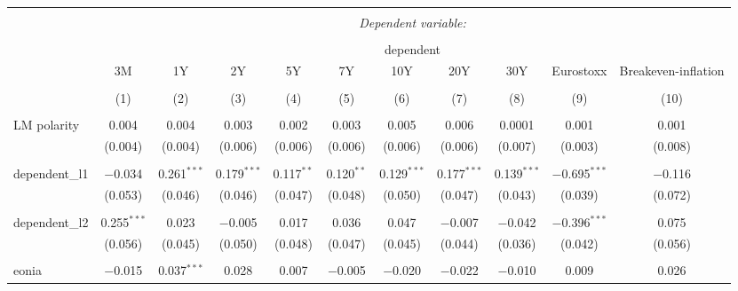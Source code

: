 

\begin{table}[!htbp] \centering 
  \caption{} 
  \label{} 
  \begin{adjustbox}{width=1.35\textwidth}
\begin{tabular}{@{\extracolsep{5pt}}lcccccccccc} 
\\[-1.8ex]\hline 
\hline \\[-1.8ex] 
 & \multicolumn{10}{c}{\textit{Dependent variable:}} \\ 
\cline{2-11} 
\\[-1.8ex] & \multicolumn{10}{c}{dependent} \\ 
 & 3M & 1Y & 2Y & 5Y & 7Y & 10Y & 20Y & 30Y & Eurostoxx & Breakeven-inflation \\ 
\\[-1.8ex] & (1) & (2) & (3) & (4) & (5) & (6) & (7) & (8) & (9) & (10)\\ 
\hline \\[-1.8ex] 
 LM polarity & 0.004 & 0.004 & 0.003 & 0.002 & 0.003 & 0.005 & 0.006 & 0.0001 & 0.001 & 0.001 \\ 
  & (0.004) & (0.004) & (0.006) & (0.006) & (0.006) & (0.006) & (0.006) & (0.007) & (0.003) & (0.008) \\ 
  & & & & & & & & & & \\ 
 dependent\_l1 & $-$0.034 & 0.261$^{***}$ & 0.179$^{***}$ & 0.117$^{**}$ & 0.120$^{**}$ & 0.129$^{***}$ & 0.177$^{***}$ & 0.139$^{***}$ & $-$0.695$^{***}$ & $-$0.116 \\ 
  & (0.053) & (0.046) & (0.046) & (0.047) & (0.048) & (0.050) & (0.047) & (0.043) & (0.039) & (0.072) \\ 
  & & & & & & & & & & \\ 
 dependent\_l2 & 0.255$^{***}$ & 0.023 & $-$0.005 & 0.017 & 0.036 & 0.047 & $-$0.007 & $-$0.042 & $-$0.396$^{***}$ & 0.075 \\ 
  & (0.056) & (0.045) & (0.050) & (0.048) & (0.047) & (0.045) & (0.044) & (0.036) & (0.042) & (0.056) \\ 
  & & & & & & & & & & \\ 
 eonia & $-$0.015 & 0.037$^{***}$ & 0.028 & 0.007 & $-$0.005 & $-$0.020 & $-$0.022 & $-$0.010 & 0.009 & 0.026 \\ 

\end{tabular}
\end{adjustbox}
\end{table}
